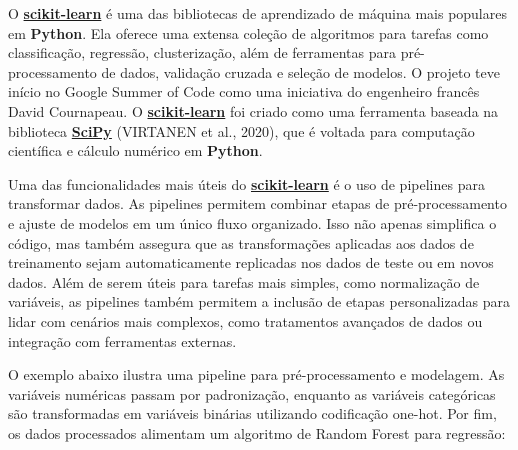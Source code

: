 \documentclass[
  12pt,
  a4paper,
]{scrreprt}
\begin{document}
\vspace{12pt}

O \href{https://scikit-learn.org/stable/}{\textbf{scikit-learn}} é uma
das bibliotecas de aprendizado de máquina mais populares em
\textbf{Python}. Ela oferece uma extensa coleção de algoritmos para
tarefas como classificação, regressão, clusterização, além de
ferramentas para pré-processamento de dados, validação cruzada e seleção
de modelos. O projeto teve início no Google Summer of Code como uma
iniciativa do engenheiro francês David Cournapeau. O
\href{https://scikit-learn.org/stable/}{\textbf{scikit-learn}} foi
criado como uma ferramenta baseada na biblioteca
\href{https://scipy.org/}{\textbf{SciPy}} (VIRTANEN et al., 2020), que é
voltada para computação científica e cálculo numérico em
\textbf{Python}.

\vspace{12pt}

Uma das funcionalidades mais úteis do
\href{https://scikit-learn.org/stable/}{\textbf{scikit-learn}} é o uso
de pipelines para transformar dados. As pipelines permitem combinar
etapas de pré-processamento e ajuste de modelos em um único fluxo
organizado. Isso não apenas simplifica o código, mas também assegura que
as transformações aplicadas aos dados de treinamento sejam
automaticamente replicadas nos dados de teste ou em novos dados. Além de
serem úteis para tarefas mais simples, como normalização de variáveis,
as pipelines também permitem a inclusão de etapas personalizadas para
lidar com cenários mais complexos, como tratamentos avançados de dados
ou integração com ferramentas externas.

\vspace{12pt}

O exemplo abaixo ilustra uma pipeline para pré-processamento e
modelagem. As variáveis numéricas passam por padronização, enquanto as
variáveis categóricas são transformadas em variáveis binárias utilizando
codificação one-hot. Por fim, os dados processados alimentam um
algoritmo de Random Forest para regressão:
\end{document}
